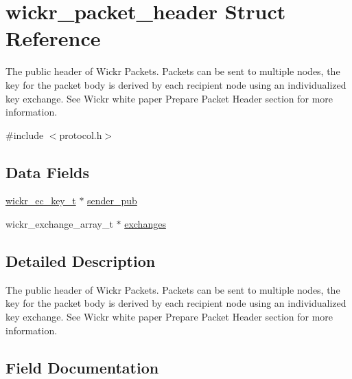 \hypertarget{structwickr__packet__header}{}\section{wickr\+\_\+packet\+\_\+header Struct Reference}
\label{structwickr__packet__header}


The public header of Wickr Packets. Packets can be sent to multiple nodes, the key for the packet body is derived by each recipient node using an individualized key exchange. See Wickr white paper \textquotesingle{}Prepare Packet Header\textquotesingle{} section for more information.  




{\ttfamily \#include $<$protocol.\+h$>$}

\subsection*{Data Fields}
\begin{DoxyCompactItemize}
\item 
\mbox{\hyperlink{structwickr__ec__key}{wickr\+\_\+ec\+\_\+key\+\_\+t}} $\ast$ \mbox{\hyperlink{structwickr__packet__header_aa32926d47dd2639030523593bfefc998}{sender\+\_\+pub}}
\item 
wickr\+\_\+exchange\+\_\+array\+\_\+t $\ast$ \mbox{\hyperlink{structwickr__packet__header_a49af3b4865a9deee0e60883134ebbb83}{exchanges}}
\end{DoxyCompactItemize}


\subsection{Detailed Description}
The public header of Wickr Packets. Packets can be sent to multiple nodes, the key for the packet body is derived by each recipient node using an individualized key exchange. See Wickr white paper \textquotesingle{}Prepare Packet Header\textquotesingle{} section for more information. 

\subsection{Field Documentation}
\mbox{\label{structwickr__packet__header_a49af3b4865a9deee0e60883134ebbb83}} 

